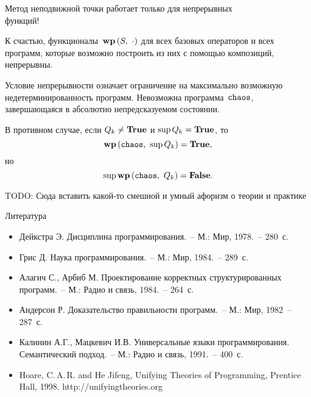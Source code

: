 \documentclass[landscape]{slides}
\begin{document}
\begin{slide}
        Метод неподвижной точки работает только для непрерывных\\функций!

        К счастью, функционалы~$\mathbf{wp}\left({S},\ {\cdot}\right)$ для всех базовых операторов и всех программ,
        которые возможно построить из них с помощью композиций, непрерывны.

        Условие непрерывности означает ограничение на максимально возможную недетерминированность
        программ. Невозможна программа~$\mathtt{chaos}$, завершающаяся в абсолютно непредсказуемом состоянии.

        В противном случае, если $Q_k\ne\mathbf{True}$ и $\sup Q_k = \mathbf{True}$, то
        \[
                \mathbf{wp}\left({\mathtt{chaos}},\ {\sup Q_k}\right) = \mathbf{True},
        \]
        но
        \[
                \sup \mathbf{wp}\left({\mathtt{chaos}},\ {Q_k}\right) = \mathbf{False}.
        \]
\end{slide}

\begin{slide}
    \begin{center}
        \begin{LARGE}
            TODO: Сюда вставить какой-то смешной и умный афоризм о теории и практике
        \end{LARGE}
    \end{center}
\end{slide}

\begin{slide}
Литература
\begin{itemize}
\item Дейкстра Э. Дисциплина программирования.~-- М.: Мир, 1978.~-- 280~с.
\item Грис Д. Наука программирования.~-- М.: Мир, 1984.~-- 289~с.
\item Алагич С., Арбиб М. Проектирование корректных структурированных программ.~-- М.: Радио и связь, 1984.~-- 264~с.
\item Андерсон Р. Доказательство правильности программ.~-- М.: Мир, 1982~-- 287~с.
\item Калинин А.Г., Мацкевич И.В. Универсальные языки программирования. Семантический подход.~-- М.: Радио и связь, 1991.~-- 400~с.
\item Hoare, C.\,A.\,R. and He Jifeng, Unifying Theories of Programming, Prentice Hall, 1998. http://unifyingtheories.org
\end{itemize}
\end{slide}
\end{document}
